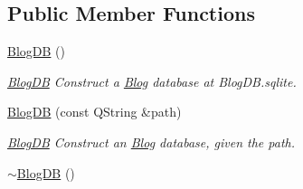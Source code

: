 \subsection*{Public Member Functions}
\begin{DoxyCompactItemize}
\item 
\hyperlink{classBlogDB_a411260738e154e8e211be307df572d2b}{Blog\+DB} ()\hypertarget{classBlogDB_a411260738e154e8e211be307df572d2b}{}\label{classBlogDB_a411260738e154e8e211be307df572d2b}

\begin{DoxyCompactList}\small\item\em \hyperlink{classBlogDB}{Blog\+DB} Construct a \hyperlink{classBlog}{Blog} database at Blog\+D\+B.\+sqlite. \end{DoxyCompactList}\item 
\hyperlink{classBlogDB_a2bc1a96e1940895126a86fafe2d39ab2}{Blog\+DB} (const Q\+String \&path)
\begin{DoxyCompactList}\small\item\em \hyperlink{classBlogDB}{Blog\+DB} Construct an \hyperlink{classBlog}{Blog} database, given the path. \end{DoxyCompactList}\item 
\hyperlink{classBlogDB_aa5345a0101e9a3f0bb62bac301428d26}{$\sim$\+Blog\+DB} ()\hypertarget{classBlogDB_aa5345a0101e9a3f0bb62bac301428d26}{}\label{classBlogDB_aa5345a0101e9a3f0bb62bac301428d26}


\end{DoxyCompactItemize}
